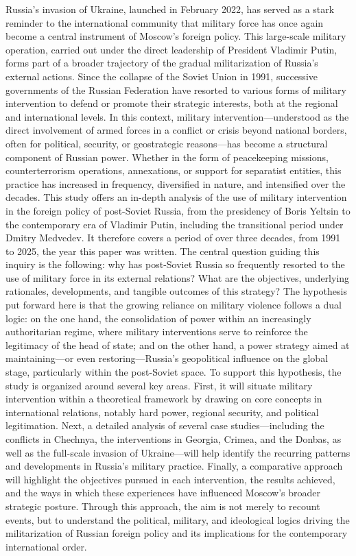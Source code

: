 \documentclass[12pt]{article}
\begin{document}
Russia’s invasion of Ukraine, launched in February 2022, has served as a stark reminder to the international community that military force has once again become a central instrument of Moscow’s foreign policy. This large-scale military operation, carried out under the direct leadership of President Vladimir Putin, forms part of a broader trajectory of the gradual militarization of Russia’s external actions. Since the collapse of the Soviet Union in 1991, successive governments of the Russian Federation have resorted to various forms of military intervention to defend or promote their strategic interests, both at the regional and international levels.
In this context, military intervention—understood as the direct involvement of armed forces in a conflict or crisis beyond national borders, often for political, security, or geostrategic reasons—has become a structural component of Russian power. Whether in the form of peacekeeping missions, counterterrorism operations, annexations, or support for separatist entities, this practice has increased in frequency, diversified in nature, and intensified over the decades.
This study offers an in-depth analysis of the use of military intervention in the foreign policy of post-Soviet Russia, from the presidency of Boris Yeltsin to the contemporary era of Vladimir Putin, including the transitional period under Dmitry Medvedev. It therefore covers a period of over three decades, from 1991 to 2025, the year this paper was written.
The central question guiding this inquiry is the following: why has post-Soviet Russia so frequently resorted to the use of military force in its external relations? What are the objectives, underlying rationales, developments, and tangible outcomes of this strategy? The hypothesis put forward here is that the growing reliance on military violence follows a dual logic: on the one hand, the consolidation of power within an increasingly authoritarian regime, where military interventions serve to reinforce the legitimacy of the head of state; and on the other hand, a power strategy aimed at maintaining—or even restoring—Russia’s geopolitical influence on the global stage, particularly within the post-Soviet space.
To support this hypothesis, the study is organized around several key areas. First, it will situate military intervention within a theoretical framework by drawing on core concepts in international relations, notably hard power, regional security, and political legitimation. Next, a detailed analysis of several case studies—including the conflicts in Chechnya, the interventions in Georgia, Crimea, and the Donbas, as well as the full-scale invasion of Ukraine—will help identify the recurring patterns and developments in Russia’s military practice. Finally, a comparative approach will highlight the objectives pursued in each intervention, the results achieved, and the ways in which these experiences have influenced Moscow’s broader strategic posture.
Through this approach, the aim is not merely to recount events, but to understand the political, military, and ideological logics driving the militarization of Russian foreign policy and its implications for the contemporary international order.
\end{document}
